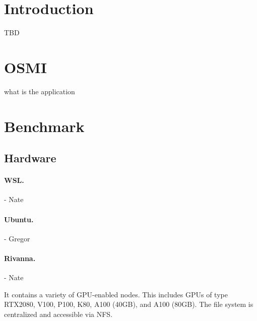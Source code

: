 \documentclass[sigplan,screen,review]{acmart}
\begin{document}





\maketitle

\section{Introduction}

TBD


\section{OSMI}

what is the application


\section{Benchmark}

\subsection{Hardware}

\paragraph{WSL.} - Nate

\paragraph{Ubuntu.} - Gregor

\paragraph{Rivanna.} - Nate

It contains a variety of GPU-enabled nodes. This includes
GPUs of type RTX2080, V100, P100, K80,   A100 (40GB), and A100 (80GB). The file system is centralized and accessible via NFS. 
\end{document}
